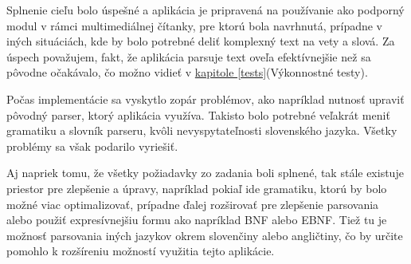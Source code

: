 \documentclass[12pt,a4paper]{report}
\theoremstyle{definition}
\theoremstyle{remark}
\begin{document}
Splnenie cieľu bolo úspešné a aplikácia je pripravená na používanie ako podporný modul v rámci multimediálnej čítanky, pre ktorú bola navrhnutá, prípadne v iných situáciách, kde by bolo potrebné deliť komplexný text na vety a slová. Za  úspech považujem, fakt, že aplikácia parsuje text oveľa efektívnejšie než sa pôvodne očakávalo, čo možno vidieť v \hyperref[tests]{kapitole \ref{tests}}(Výkonnostné testy).



Počas implementácie sa vyskytlo zopár problémov, ako napríklad nutnosť upraviť pôvodný parser, ktorý aplikácia využíva. Takisto bolo potrebné veľakrát meniť gramatiku a slovník parseru, kvôli nevyspytateľnosti slovenského jazyka. Všetky problémy sa však podarilo vyriešiť.

Aj napriek tomu, že všetky požiadavky zo zadania boli splnené, tak stále existuje priestor pre zlepšenie a úpravy, napríklad pokiaľ ide gramatiku, ktorú by bolo možné viac optimalizovať, prípadne ďalej rozširovať pre zlepšenie parsovania alebo použiť expresívnejšiu formu ako napríklad BNF alebo EBNF. Tiež tu je možnosť parsovania iných jazykov okrem slovenčiny alebo angličtiny, čo by určite pomohlo k rozšíreniu možností využitia tejto aplikácie. 
\end{document}
